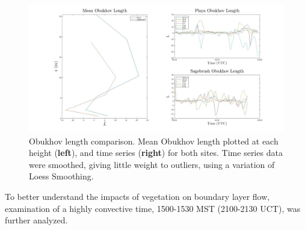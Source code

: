 \documentclass[]{article}
\begin{document}
\begin{figure}
	\centering
	\includegraphics[width=\textwidth]{oblength}
	\caption{Obukhov length comparison. Mean Obukhov length plotted at each height (\textbf{left}), and time series (\textbf{right}) for both sites. Time series data were smoothed, giving little weight to outliers, using a variation of Loess Smoothing.}
	\label{fig:L}
\end{figure}



To better understand the impacts of vegetation on boundary layer flow, examination of a highly convective time, 1500-1530 MST (2100-2130 UCT), was further analyzed. 
 
\end{document}
